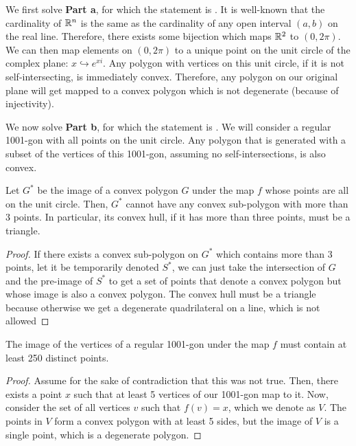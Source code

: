 \documentclass[10pt]{../usamts}
\begin{document}
\begin{solution}

We first solve \textbf{Part a}, for which the statement is . It is well-known that the cardinality of $\mathbb{R}^n$ is the same as the cardinality of any open interval $(a,b)$ on the real line. Therefore, there exists some bijection which maps $\mathbb{R}^2$ to $(0,2\pi)$. We can then map elements on $(0,2\pi)$ to a unique point on the unit circle of the complex plane: $x \hookrightarrow e^{xi}$. Any polygon with vertices on this unit circle, if it is not self-intersecting, is immediately convex. Therefore, any polygon on our original plane will get mapped to a convex polygon which is not degenerate (because of injectivity).


We now solve \textbf{Part b}, for which the statement is . We will consider a regular 1001-gon with all points on the unit circle. Any polygon that is generated with a subset of the vertices of this 1001-gon, assuming no self-intersections, is also convex.
\begin{claim}
    Let $G^*$ be the image of a convex polygon $G$ under the map $f$ whose points are all on the unit circle. Then, $G^*$ cannot have any convex sub-polygon with more than 3 points. In particular, its convex hull, if it has more than three points, must be a triangle.
\end{claim}
\begin{proof}
    If there exists a convex sub-polygon on $G^*$ which contains more than 3 points, let it be temporarily denoted $S^*$, we can just take the intersection of $G$ and the pre-image of $S^*$ to get a set of points that denote a convex polygon but whose image is also a convex polygon. The convex hull must be a triangle because otherwise we get a degenerate quadrilateral on a line, which is not allowed
\end{proof}

\begin{claim}
    The image of the vertices of a regular 1001-gon under the map $f$ must contain at least 250 distinct points.
\end{claim}
\begin{proof}
    Assume for the sake of contradiction that this was not true. Then, there exists a point $x$ such that at least 5 vertices of our 1001-gon map to it. Now, consider the set of all vertices $v$ such that $f(v) = x$, which we denote as $V$. The points in $V$ form a convex polygon with at least 5 sides, but the image of $V$ is a single point, which is a degenerate polygon.
\end{proof}


\end{solution}
\end{document}
